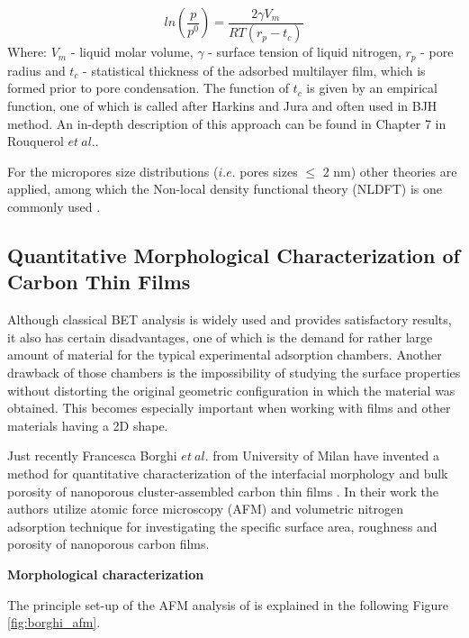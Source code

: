 \begin{equation}
\label{eq:Kelvin}
    ln(\frac{p}{p^0})=\frac{2\gamma V_m}{RT(r_p - t_c)}
\end{equation}
Where: $V_m$ - liquid molar volume, $\gamma$ - surface tension of liquid nitrogen, $r_p$ - pore radius and $t_c$ - statistical thickness of the adsorbed multilayer film, which is formed prior to pore condensation.
The function of $t_c$ is given by an empirical function, one of which is called after Harkins and Jura and often used in BJH method. An in-depth description of this approach can be found in Chapter 7 in Rouquerol \textit{$et\:al.$}\cite{ROUQUEROL1999191}. 

For the micropores size distributions ($i.e.$ pores sizes $\le$ 2 nm) other theories are applied, among which the Non-local density functional theory (NLDFT) is one commonly used \cite{wu_jligorous_nodate}.

\subsection {Quantitative Morphological Characterization of Carbon Thin Films}
\label{Borghi-theory}

Although classical BET analysis is widely used and provides satisfactory results, it also has certain disadvantages, one of which is the demand for rather large amount of material for the typical experimental adsorption chambers. Another drawback of those chambers is the impossibility of studying the surface properties without distorting the original geometric configuration in which the material was obtained. This becomes especially important when working with films and other materials having a 2D shape. 

Just recently Francesca Borghi \textit{$et\:al.$} from University of Milan have invented a method for quantitative characterization of the interfacial morphology and bulk porosity of nanoporous cluster-assembled carbon thin films \cite{borghi_quantitative_2019}. In their work the authors utilize atomic force microscopy (AFM) and volumetric nitrogen adsorption technique for investigating the specific surface area, roughness and porosity of nanoporous carbon films. 

\medskip
\textbf{Morphological characterization}

The principle set-up of the AFM analysis of is explained in the following Figure \ref{fig:borghi_afm}.

